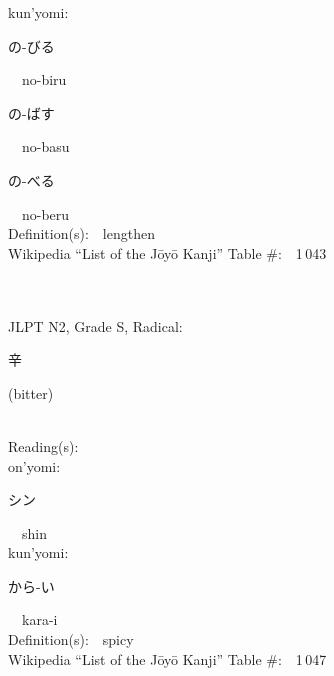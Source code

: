 \begin{multicols}{2}
{\hspace*{1em}}kun'yomi:\ \ \\
{\hspace*{2em}}{\begin{CJK}{UTF8}{min} の-びる \end{CJK}}\ \ no-biru\ \ \\
{\hspace*{2em}}{\begin{CJK}{UTF8}{min} の-ばす \end{CJK}}\ \ no-basu\ \ \\
{\hspace*{2em}}{\begin{CJK}{UTF8}{min} の-べる \end{CJK}}\ \ no-beru\ \ \\
Definition(s):\ \ lengthen \\
Wikipedia ``List of the J\=oy\=o Kanji'' Table \#:\ \ 1\,043 \\
\ \ \\
{\fontsize{34pt}{40pt}  }\ \ \\  %
{JLPT N2, Grade S, Radical:\ \ {\begin{CJK}{UTF8}{min} 辛 \end{CJK}} (bitter) } \\
Reading(s):\ \ \\
{\hspace*{1em}}on'yomi:\ \ \\
{\hspace*{2em}}{\begin{CJK}{UTF8}{min} シン \end{CJK}}\ \ shin\ \ \\
{\hspace*{1em}}kun'yomi:\ \ \\
{\hspace*{2em}}{\begin{CJK}{UTF8}{min} から-い \end{CJK}}\ \ kara-i\ \ \\
Definition(s):\ \ spicy \\
Wikipedia ``List of the J\=oy\=o Kanji'' Table \#:\ \ 1\,047 \\
\ \ \\
{\fontsize{34pt}{40pt}  }\ \ \\  %

\end{multicols}

